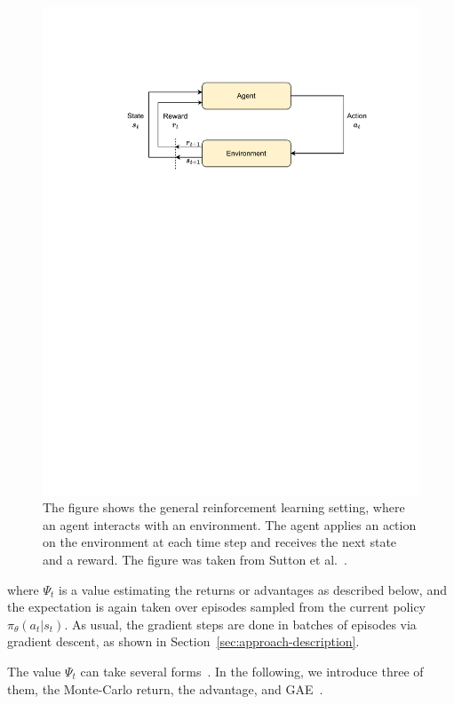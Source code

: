 \begin{figure}
	\centering
	\includegraphics[clip, trim=3cm 18cm 3cm 3cm, width=1.0\textwidth]{figures/rl}
	\caption{The figure shows the general reinforcement learning setting, where an agent interacts with an environment. The agent applies an action on the environment at each time step 
	and receives the next state and a reward. The figure was taken from Sutton et al.~\cite{Sutton1998RL}.}
	\label{fig:rl}
\end{figure}

where $\Psi_t$ is a value estimating the returns or advantages as described below, and the expectation is again 
taken over episodes sampled from the current policy $\pi_\theta(a_t | s_t)$. As usual, the gradient 
steps are done in batches of episodes via gradient descent, as shown in Section~\ref{sec:approach-description}. 

The value $\Psi_t$ can take several forms~\cite{Schulman2016GAE}. In the following, we 
introduce three of them, the Monte-Carlo return, the advantage, and GAE~\cite{Schulman2016GAE}.


